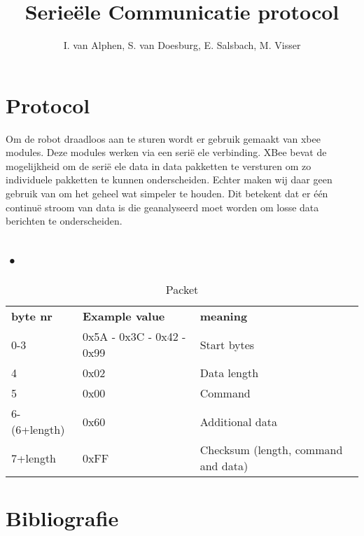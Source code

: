 \documentclass[10pt,a4paper]{article}
\title{Serie\"ele Communicatie protocol}
\author{I. van Alphen, S. van Doesburg, E.  Salsbach, M. Visser}
\begin{document}
\maketitle
\newpage

\section{Protocol}
Om de robot draadloos aan te sturen wordt er gebruik gemaakt van xbee modules. Deze modules werken via een seri\"e ele verbinding. XBee bevat de mogelijkheid om de seri\"e ele data in data pakketten te versturen om zo individuele pakketten te kunnen onderscheiden. Echter maken wij daar geen gebruik van om het geheel wat simpeler te houden. Dit betekent dat er \' e\'en continu\"e stroom van data is die geanalyseerd moet worden om losse data berichten te onderscheiden.

\subsection{•}
\begin{table}[H]
\centering
\begin{tabular}{lll}
\textbf{byte nr}      & \textbf{Example value}             & \textbf{meaning}                           \\
0-3          & 0x5A - 0x3C - 0x42 - 0x99 & Start bytes                       \\
4            & 0x02                      & Data length \\
5            & 0x00                      & Command                           \\
6-(6+length) & 0x60                      & Additional data                   \\
7+length     & 0xFF                      & Checksum (length, command and data)                  
\end{tabular}
\caption{Packet}
\label{my-label}
\end{table}

\section{Bibliografie}


\end{document}

